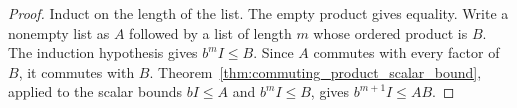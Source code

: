 \begin{proof}
    \leanok
    Induct on the length of the list. The empty product gives equality.
    Write a nonempty list as $A$ followed by a list of length $m$ whose
    ordered product is $B$. The induction hypothesis gives $b^m I\le B$.
    Since $A$ commutes with every factor of $B$, it commutes with $B$.
    Theorem~\ref{thm:commuting_product_scalar_bound}, applied to the scalar
    bounds $bI\le A$ and $b^m I\le B$, gives $b^{m+1}I\le AB$.
\end{proof}
